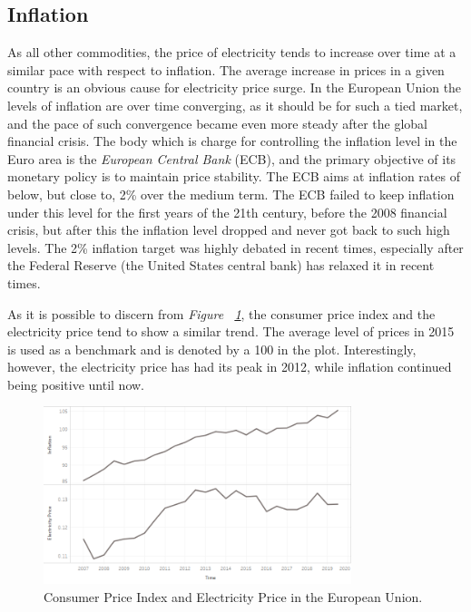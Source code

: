 \documentclass[a4paper,12pt]{book}
\begin{document}
\subsection{Inflation}

As all other commodities, the price of electricity tends to increase over time at a similar pace with respect to inflation. The average increase in prices in a given country is an obvious cause for electricity price surge. In the European Union the levels of inflation are over time converging, as it should be for such a tied market, and the pace of such convergence became even more steady after the global financial crisis. \cite{brovz2018dynamics} The body which is charge for controlling the inflation level in the Euro area is the \textit{European Central Bank} (ECB), and the primary objective of its monetary policy is to maintain price stability. The ECB aims at inflation rates of below, but close to, 2\% over the medium term. The ECB failed to keep inflation under this level for the first years of the 21th century, before the 2008 financial crisis, but after this the inflation level dropped and never got back to such high levels. The 2\% inflation target was highly debated in recent times, especially after the Federal Reserve (the United States central bank) has relaxed it in recent times.

As it is possible to discern from \textit{Figure ~\ref{fig:infl}}, the consumer price index and the electricity price tend to show a similar trend. The average level of prices in 2015 is used as a benchmark and is denoted by a 100 in the plot. Interestingly, however, the electricity price has had its peak in 2012, while inflation continued being positive until now. 

\begin{figure}[tb]
\begin{center}
\captionsetup{justification=centering}
\includegraphics[width=0.8\textwidth]{Images/inf.png}
\caption{Consumer Price Index and Electricity Price in the European Union.}
\label{fig:infl}
\end{center}
\end{figure}
\end{document}
